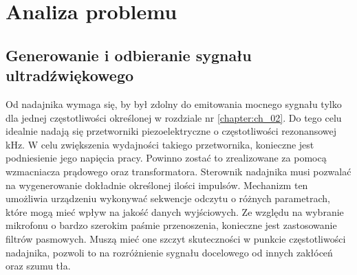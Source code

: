 \chapter[Analiza problemu]{Analiza problemu}

\label{chapter:analiza_problemu}


\def\w{1} %
\def\h{1} %

\newcommand{\mysin}[2] %
{%
  \begin{scope}[shift={#1}]
    \draw[thick,#2] (0,0) sin (0.125*\w,0.5*\h) cos (0.25*\w,0) sin (0.375*\w,-0.5*\h) cos (0.5*\w,0)
                          sin (0.625*\w,0.5*\h) cos (0.75*\w,0) sin (0.875*\w,-0.5*\h) cos (\w,0);
  \end{scope}
}

\section{Generowanie i odbieranie sygnału ultradźwiękowego}

Od nadajnika wymaga się, by był zdolny do emitowania mocnego sygnału tylko dla jednej częstotliwości określonej w rozdziale nr \ref{chapter:ch_02}.
Do tego celu idealnie nadają się przetworniki piezoelektryczne o częstotliwości rezonansowej \unit[40]{kHz}. W celu zwiększenia wydajności takiego przetwornika,
konieczne jest podniesienie jego napięcia pracy. Powinno zostać to zrealizowane za pomocą wzmacniacza prądowego oraz transformatora. 
Sterownik nadajnika musi pozwalać na wygenerowanie dokładnie określonej ilości impulsów. 
Mechanizm ten umożliwia urządzeniu wykonywać sekwencje odczytu o różnych parametrach, które mogą mieć wpływ na jakość danych wyjściowych. 
Ze względu na wybranie mikrofonu o bardzo szerokim paśmie przenoszenia, konieczne jest zastosowanie filtrów pasmowych. 
Muszą mieć one szczyt skuteczności w punkcie częstotliwości nadajnika, pozwoli to na rozróżnienie sygnału docelowego od innych zakłóceń oraz szumu tła.

